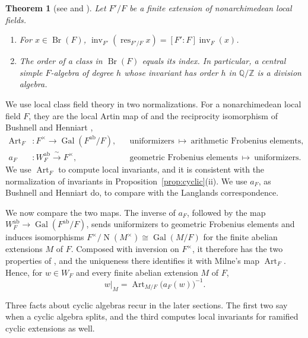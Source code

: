 \documentclass[a4paper,11pt]{amsart}
\newtheorem{theorem}{Theorem}[section]
\theoremstyle{definition}
\theoremstyle{remark}
\numberwithin{equation}{section}
\newcommand{\Q}{\mathbb{Q}}
\newcommand{\Z}{\mathbb{Z}}
\DeclareMathOperator{\Br}{Br}
\DeclareMathOperator{\inv}{inv}
\DeclareMathOperator{\res}{res}
\DeclareMathOperator{\Gal}{Gal}
\DeclareMathOperator{\Art}{Art}
\DeclareMathOperator{\Nm}{N}
\begin{document}
\begin{theorem}[see {\cite[III, \S2, (29)]{Mil20}} and {\cite[IV, Remark~4.4(b)]{Mil20}}]
\label{thm:local-brauer}
Let $F'/F$ be a finite extension of nonarchimedean local fields.
\begin{enumerate}
\item[(a)] For $x\in\Br(F)$, $\inv_{F'}(\res_{F'/F}x)=[F':F]\inv_F(x)$.
\item[(b)] The order of a class in $\Br(F)$ equals its index. In particular, a central simple $F$-algebra of degree $h$ whose invariant has order $h$ in $\Q/\Z$ is a division algebra.
\end{enumerate}
\end{theorem}

We use local class field theory in two normalizations. For a nonarchimedean
local field $F$, they are the local Artin map of \cite[I, Theorem~1.1]{Mil20}
and the reciprocity isomorphism of Bushnell and Henniart \cite[1.4]{BH11L},
\[
\begin{aligned}
 \Art_F&\colon F^\times\longrightarrow\Gal(F^{\mathrm{ab}}/F), &&\text{uniformizers}\ \mapsto\ \text{arithmetic Frobenius elements},\\
 a_F&\colon W_F^{\mathrm{ab}}\xrightarrow{\ \sim\ }F^\times, &&\text{geometric Frobenius elements}\ \mapsto\ \text{uniformizers}.
\end{aligned}
\]
We use $\Art_F$ to compute local invariants, and it is consistent with the normalization of invariants in Proposition~\ref{prop:cyclic}(ii). We use $a_F$, as Bushnell and Henniart do, to compare with the Langlands correspondence.

We now compare the two maps. The inverse of $a_F$, followed by the map $W_F^{\mathrm{ab}}\to\Gal(F^{\mathrm{ab}}/F)$, sends uniformizers to geometric Frobenius elements and induces isomorphisms $F^\times/\Nm(M^\times)\cong\Gal(M/F)$ for the finite abelian extensions $M$ of $F$. Composed with inversion on $F^\times$, it therefore has the two properties of \cite[I, Theorem~1.1]{Mil20}, and the uniqueness there identifies it with Milne's map $\Art_F$. Hence, for $w\in W_F$ and every finite abelian extension $M$ of $F$,
\begin{equation}\label{eq:weil-galois}
 w|_M=\Art_{M/F}\bigl(a_F(w)\bigr)^{-1}.
\end{equation}

Three facts about cyclic algebras recur in the later sections. The first two say when a cyclic algebra splits, and the third computes local invariants for ramified cyclic extensions as well.
\end{document}

